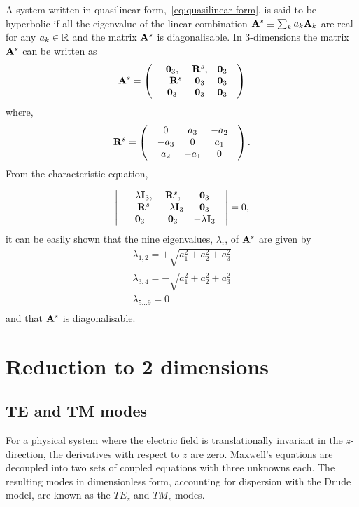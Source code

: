 A system written in quasilinear form,~\eqref{eq:quasilinear-form}, is said to be
hyperbolic if all the eigenvalue of the linear combination $ \mathbf{A}^{s}
\equiv \sum_{k} a_{k} \mathbf{A}_k $ are real for any $a_{k} \in \mathbb{R}$ and
the matrix $\mathbf{A}^{s}$ is diagonalisable. In $3$-dimensions the matrix
$\mathbf{A}^{s}$ can be written as
$$
  \mathbf{A}^{s} =
  \begin{pmatrix}
 & \mathbf{0}_3 , & \mathbf{R}^{s}, & \mathbf{0}_3 \\
 & -\mathbf{R}^{s} & \mathbf{0}_3 & \mathbf{0}_3 \\
 & \mathbf{0}_3 & \mathbf{0}_3 & \mathbf{0}_3 
 & \end{pmatrix}
$$
where,
$$
  \mathbf{R}^{s} =
  \begin{pmatrix}
 & 0 & a_3 & -a_2 \\
 & -a_3 & 0 & a_1 \\
& a_2 & -a_1 & 0 
 & \end{pmatrix} .
$$
From the characteristic equation,

$$
  \begin{vmatrix}
 & -\lambda \mathbf{I}_3, & \mathbf{R}^{s}, & \mathbf{0}_3 \\
 & -\mathbf{R}^{s} & -\lambda \mathbf{I}_3 & \mathbf{0}_3 \\
 & \mathbf{0}_3 & \mathbf{0}_3 & -\lambda \mathbf{I}_3
 & \end{vmatrix}
= 0 ,
$$
it can be easily shown that the nine eigenvalues, $\lambda_{i}$, of $\mathbf{A}^{s}$ are given by
\begin{align}
\lambda_{1,2} = + \sqrt{a_1^2 + a_2^2 + a_3^2} \\
\lambda_{3,4} = - \sqrt{a_1^2 + a_2^2 + a_3^2} \\
\lambda_{5...9} = 0 \\
\end{align}
and that $\mathbf{A}^{s}$ is diagonalisable.
% 

\section{Reduction to 2 dimensions}
\subsection{TE and TM modes}
For a physical system where the electric field is translationally invariant in
the $z$-direction, the derivatives with respect to $z$ are zero. Maxwell's
equations are decoupled into two sets of coupled equations with three unknowns
each. The resulting modes in dimensionless form, accounting for dispersion with
the Drude model, are known as the $TE_z$ and $TM_z$ modes.

